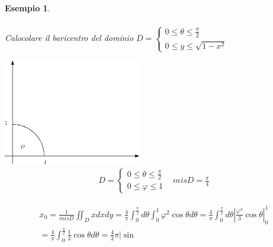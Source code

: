 \documentclass{book}
\newtheorem{esempio}{Esempio}
\begin{document}
\begin{esempio}
\begin{equation*}
\begin{matrix}
    \end{matrix}
  \end{equation*}
  \clearpage
   \begin{center}
            \fbox
            {
            \begin{minipage}{0.85\textwidth}
		Calocolare il baricentro del dominio $D=\begin{cases}
                                                          0\leq \theta \leq \frac{\pi}{2}\\
                                                          0\leq y \leq \sqrt{1-x^2}
                                                          \end{cases}$
              \begin{multicols}{2}
                \includegraphics[width=6cm]{img/finiti/baricentrodiundominionormale2.eps}\\
                \begin{equation*}
                  \begin{matrix}
                    D=\begin{cases}
                      0\leq \theta\leq\frac{\pi}{2}\\
                      0\leq \varphi\leq 1
                    \end{cases} & mis D=\frac{\pi}{4}
                  \end{matrix}
                \end{equation*}
              \end{multicols}
              \begin{equation*}
                \begin{matrix}
                  x_0= \frac{1}{mis D}\iint_D xdxdy=\frac{4}{\pi}
                  \int^{\frac{\pi}{2}}_0d\theta\int_0^1
                  \varphi^2\cos \theta d\theta = \frac{4}{\pi} \int_0^{\frac{\pi}{2}}d\theta \left|
                  \frac{\varphi^3}{3}\cos\theta\right|_0^1\\=\frac{4}{\pi}\int_0^{\frac{\pi}{2}}
                  \frac{1}{3} \cos \theta d\theta = \frac{4}{3}\pi \left|\sin

\end{matrix}
\end{equation*}
\end{minipage}}
\end{center}
\end{esempio}
\end{document}
